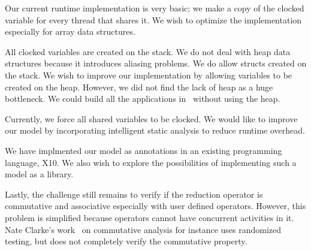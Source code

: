 \documentclass[10pt, conference, compsocconf]{IEEEtran}
\begin{document}
Our current runtime implementation is very basic; we make a copy
of the clocked variable for every thread that shares it.  
We wish to optimize
the implementation especially for array data structures.

All clocked variables are created on the stack.
We do not deal with heap data structures because
it introduces aliasing problems. We do allow structs
created on the stack.
We wish to improve
our implementation by allowing variables to be created on the heap.
However, we did not find the lack of heap as a huge bottleneck.
We could build all the applications in~ without
using the heap.

Currently, we force all shared variables to be clocked. We would
like to improve our model by incorporating intelligent
static analysis to reduce runtime overhead.


We have implmented our model as annotations in an existing
programming language, X10.
We also wish to explore the possibilities of implementing such a model
as a library.

Lastly, the challenge still remains to verify if the reduction operator
is commutative and associative especially with user defined operators.
However, this problem is simplified because operators cannot
have concurrent activities in it.
Nate Clarke's work~\cite{aleen2009commutativity} on commutative
analysis for instance uses randomized testing, but does not completely
verify the commutative property.





\end{document}
